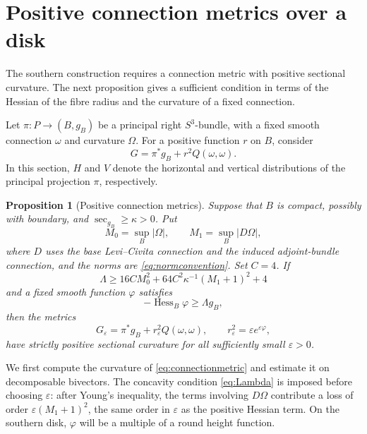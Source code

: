\documentclass[12pt]{amsart}
\numberwithin{equation}{section}
\newtheorem{proposition}[theorem]{Proposition}
\theoremstyle{remark}
\newcommand{\eps}{\varepsilon}
\newcommand{\Hess}{\operatorname{Hess}}
\newcommand{\Ksec}{\operatorname{sec}}
\begin{document}
\section{Positive connection metrics over a disk}\label{sec:cap}

The southern construction requires a connection metric with positive
sectional curvature. The next proposition gives a sufficient
condition in terms of the Hessian of the fibre radius and the
curvature of a fixed connection.

Let \(\pi:P\to(B,g_B)\) be a principal right \(S^3\)-bundle, with
a fixed smooth connection \(\omega\) and curvature \(\Omega\).
For a positive function \(r\) on \(B\), consider
\begin{equation}\label{eq:connectionmetric}
G=\pi^*g_B+r^2Q(\omega,\omega).
\end{equation}
In this section, \(H\) and \(V\) denote the horizontal and vertical
distributions of the principal projection \(\pi\), respectively.

\begin{proposition}[Positive connection metrics]\label{prop:concave}
Suppose that \(B\) is compact, possibly with boundary, and
\(\Ksec_{g_B}\ge\kappa>0\). Put
\[
M_0=\sup_B|\Omega|,\qquad
M_1=\sup_B|D\Omega|,
\]
where \(D\) uses the base Levi--Civita connection and the induced
adjoint-bundle connection, and the norms are \eqref{eq:normconvention}.
Set \(C=4\). If
\begin{equation}\label{eq:Lambda}
\Lambda\ge16CM_0^2+
           64C^2\kappa^{-1}(M_1+1)^2+4
\end{equation}
and a fixed smooth function \(\varphi\) satisfies
\[
-\Hess_B\varphi\ge\Lambda g_B,
\]
then the metrics
\begin{equation}\label{eq:smallradius}
G_\eps=\pi^*g_B+r_\eps^2Q(\omega,\omega),
\qquad r_\eps^2=\eps e^{\eps\varphi},
\end{equation}
have strictly positive sectional curvature for all sufficiently small
\(\eps>0\).
\end{proposition}

We first compute the curvature of \eqref{eq:connectionmetric} and
estimate it on decomposable bivectors. The concavity condition
\eqref{eq:Lambda} is imposed before choosing \(\eps\): after
Young's inequality, the terms involving \(D\Omega\) contribute a
loss of order \(\eps(M_1+1)^2\), the same order in \(\eps\) as
the positive Hessian term. On the southern disk, \(\varphi\) will
be a multiple of a round height function.
\end{document}
